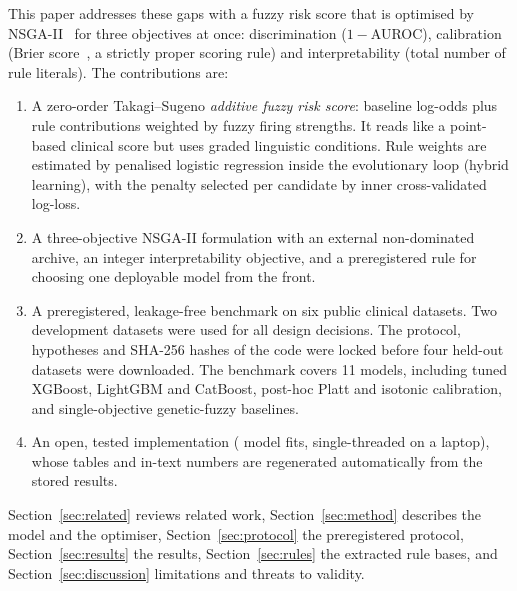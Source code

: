 This paper addresses these gaps with a fuzzy risk score that is optimised by NSGA-II~\cite{deb2002}
for three objectives at once: discrimination ($1-$AUROC), calibration (Brier
score~\cite{brier1950}, a strictly proper scoring rule) and interpretability (total
number of rule literals). The contributions are:
\begin{enumerate}
\item A zero-order Takagi--Sugeno \emph{additive fuzzy risk score}: baseline log-odds
plus rule contributions weighted by fuzzy firing strengths. It reads like a point-based
clinical score but uses graded linguistic conditions. Rule weights are estimated by
penalised logistic regression inside the evolutionary loop (hybrid learning), with the
penalty selected per candidate by inner cross-validated log-loss.
\item A three-objective NSGA-II formulation with an external non-dominated archive, an
integer interpretability objective, and a preregistered rule for choosing one
deployable model from the front.
\item A preregistered, leakage-free benchmark on six public clinical datasets. Two
development datasets were used for all design decisions. The protocol, hypotheses and
SHA-256 hashes of the code were locked before four held-out datasets were downloaded.
The benchmark covers 11 models, including tuned XGBoost, LightGBM and CatBoost, post-hoc
Platt and isotonic calibration, and single-objective genetic-fuzzy baselines.
\item An open, tested implementation (\resNFits{} model fits, single-threaded on a
laptop), whose tables and in-text numbers are regenerated automatically from the
stored results.
\end{enumerate}

Section~\ref{sec:related} reviews related work, Section~\ref{sec:method} describes the
model and the optimiser, Section~\ref{sec:protocol} the preregistered protocol,
Section~\ref{sec:results} the results, Section~\ref{sec:rules} the extracted rule bases,
and Section~\ref{sec:discussion} limitations and threats to validity.
